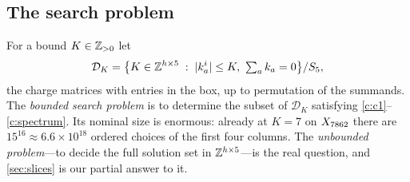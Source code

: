 \subsection{The search problem}

For a bound $K\in\mathbb{Z}_{>0}$ let
\begin{equation}
\mathcal D_K=\bigl\{K\in\Z^{h\times5}\;:\;|k_a^i|\le K,\ \textstyle\sum_ak_a=0\bigr\}/S_5 ,
\end{equation}
the charge matrices with entries in the box, up to permutation of the summands.
The \emph{bounded search problem} is to determine the subset of $\mathcal D_K$
satisfying \ref{c:c1}--\ref{c:spectrum}. Its nominal size is enormous: already at
$K=7$ on $X_{7862}$ there are $15^{16}\approx6.6\times10^{18}$ ordered choices of the
first four columns. The \emph{unbounded problem}---to decide the full solution
set in $\mathbb{Z}^{h\times5}$---is the real question, and \cref{sec:slices} is our
partial answer to it.
